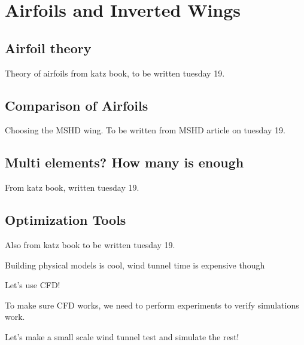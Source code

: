 \chapter{Airfoils and Inverted Wings}

\section{Airfoil theory}
Theory of airfoils from katz book, to be written tuesday 19.

\section{Comparison of Airfoils}
Choosing the MSHD wing.
To be written from MSHD article on tuesday 19.

\section{Multi elements? How many is enough}
From katz book, written tuesday 19.

\section{Optimization Tools}

Also from katz book to be written tuesday 19.

Building physical models is cool, wind tunnel time is expensive though

Let's use CFD!

To make sure CFD works, we need to perform experiments to verify simulations work.

Let's make a small scale wind tunnel test and simulate the rest!
